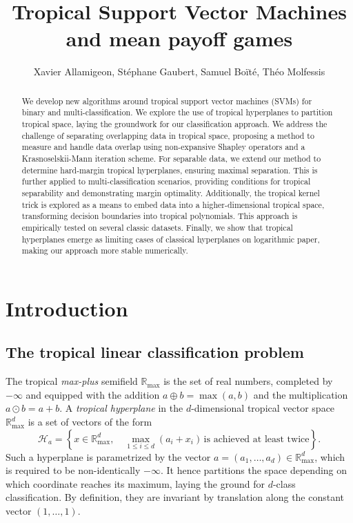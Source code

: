 \documentclass[oneside,english,a4paper]{amsart}
\numberwithin{equation}{section}
\numberwithin{figure}{section}
\theoremstyle{plain}
\theoremstyle{definition}
\theoremstyle{plain}
\theoremstyle{remark}
\theoremstyle{plain}
\theoremstyle{definition}
\theoremstyle{definition}
\begin{document}
\title{Tropical Support Vector Machines and mean payoff games}
\author{Xavier Allamigeon, Stéphane Gaubert, Samuel Boïté, Théo Molfessis}
\maketitle

\begin{abstract}
    We develop new algorithms around tropical support vector machines (SVMs) for binary and multi-classification. We explore the use of tropical hyperplanes to partition tropical space, laying the groundwork for our classification approach. We address the challenge of separating overlapping data in tropical space, proposing a method to measure and handle data overlap using non-expansive Shapley operators and a Krasnoselskii-Mann iteration scheme. For separable data, we extend our method to determine hard-margin tropical hyperplanes, ensuring maximal separation. This is further applied to multi-classification scenarios, providing conditions for tropical separability and demonstrating margin optimality. Additionally, the tropical kernel trick is explored as a means to embed data into a higher-dimensional tropical space, transforming decision boundaries into tropical polynomials. This approach is empirically tested on several classic datasets. Finally, we show that tropical hyperplanes emerge as limiting cases of classical hyperplanes on logarithmic paper, making our approach more stable numerically.
\end{abstract}

\section{Introduction}


\subsection*{The tropical linear classification problem}

The tropical \emph{max-plus} semifield $\mathbb{R}_{\max}$ is the
set of real numbers, completed by $-\infty$ and equipped with the
addition $a\oplus b=\max(a,b)$ and the multiplication $a\odot b=a+b$.
A \emph{tropical hyperplane} in the $d$-dimensional tropical vector
space $\mathbb{R}_{\max}^{d}$ is a set of vectors of the form
\[
\mathcal{H}_{a}=\left\{x\in\mathbb{R}_{\max}^{d},\quad\max_{1\le i\le d}(a_{i}+x_{i})\,\text{is achieved at least twice}\right\}.
\]
Such a hyperplane is parametrized by the vector $a=(a_{1},\ldots,a_{d})\in\mathbb{R}_{\max}^{d}$,
which is required to be non-identically $-\infty$. It hence partitions
the space depending on which coordinate reaches its maximum, laying the
ground for $d$-class classification. By definition, they are invariant by translation along the constant vector $(1,\ldots, 1)$.
\end{document}
